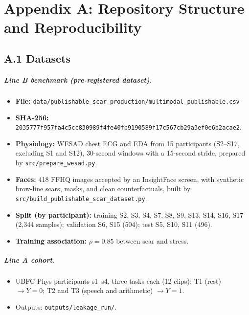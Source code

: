 \chapter*{Appendix A: Repository Structure and Reproducibility}

\section*{A.1 Datasets}
\paragraph{Line B benchmark (pre-registered dataset).}
\begin{itemize}
    \item \textbf{File:} \texttt{data/publishable\_scar\_production/multimodal\_publishable.csv}
    \item \textbf{SHA-256:} \texttt{2035777f957fa4c5cc830989f4fe40fb9190589f17c567cb29a3ef0e6b2acae2}.
    \item \textbf{Physiology:} WESAD chest ECG and EDA from 15 participants (S2--S17, excluding S1 and S12), 30-second windows with a 15-second stride, prepared by \texttt{src/prepare\_wesad.py}.
    \item \textbf{Faces:} 418 FFHQ images accepted by an InsightFace screen, with synthetic brow-line scars, masks, and clean counterfactuals, built by \texttt{src/build\_publishable\_scar\_dataset.py}.
    \item \textbf{Split (by participant):} training S2, S3, S4, S7, S8, S9, S13, S14, S16, S17 (2,344 samples); validation S6, S15 (504); test S5, S10, S11 (496).
    \item \textbf{Training association:} $\rho = 0.85$ between scar and stress.
\end{itemize}
\paragraph{Line A cohort.}
\begin{itemize}
    \item UBFC-Phys participants s1--s4, three tasks each (12 clips); T1 (rest) $\rightarrow Y = 0$; T2 and T3 (speech and arithmetic) $\rightarrow Y = 1$.
    \item Outputs: \texttt{outputs/leakage\_run/}.
\end{itemize}

